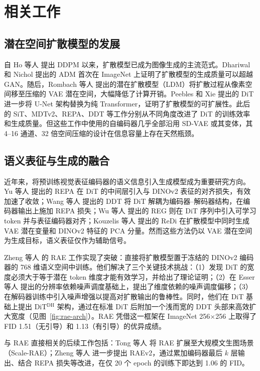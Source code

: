 \documentclass[11pt]{article}
\begin{document}
\section{相关工作}

\subsection{潜在空间扩散模型的发展}

自 Ho 等人\cite{ddpm} 提出 DDPM 以来，扩散模型已成为图像生成的主流范式。Dhariwal 和 Nichol\cite{adm} 提出的 ADM 首次在 ImageNet 上证明了扩散模型的生成质量可以超越 GAN\cite{gan}。随后，Rombach 等人\cite{ldm} 提出的潜在扩散模型（LDM）将扩散过程从像素空间移至压缩的 VAE 潜在空间，大幅降低了计算开销。Peebles 和 Xie\cite{dit} 提出的 DiT 进一步将 U-Net 架构替换为纯 Transformer，证明了扩散模型的可扩展性。此后的 SiT\cite{sit}、MDTv2\cite{mdtv2}、REPA\cite{repa}、DDT\cite{ddt} 等工作分别从不同角度改进了 DiT 的训练效率和生成质量。但这些工作中使用的自编码器几乎全部沿用 SD-VAE 或其变体，其 4--16 通道、32 倍空间压缩的设计在信息容量上存在天然瓶颈。

\subsection{语义表征与生成的融合}

近年来，将预训练视觉表征编码器的语义信息引入生成模型成为重要研究方向。Yu 等人\cite{repa} 提出的 REPA 在 DiT 的中间层引入与 DINOv2 表征的对齐损失，有效加速了收敛；Wang 等人\cite{ddt} 提出的 DDT 将 DiT 解耦为编码器--解码器结构，在编码器输出上施加 REPA 损失；Wu 等人\cite{reg} 提出的 REG 则在 DiT 序列中引入可学习 token 并与表征编码器对齐；Kouzelis 等人\cite{redi} 提出的 ReDi 在扩散模型中同时生成 VAE 潜在变量和 DINOv2 特征的 PCA 分量。然而这些方法仍以 VAE 潜在空间为生成目标，语义表征仅作为辅助信号。

Zheng 等人\cite{rae} 的 RAE 工作实现了突破：直接将扩散模型置于冻结的 DINOv2 编码器的 768 维语义空间中训练。他们解决了三个关键技术挑战：（1）发现 DiT 的宽度必须大于等于潜在 token 维度才能有效学习，并给出了理论证明；（2）在 Esser 等人\cite{sd3} 提出的分辨率依赖噪声调度基础上，提出了维度依赖的噪声调度偏移；（3）在解码器训练中引入噪声增强以提高对扩散输出的鲁棒性。同时，他们在 DiT 基础上提出 DiT$^{\mathrm{DH}}$ 架构，通过在标准 DiT 后附加一个浅而宽的 DDT 头部来高效扩大宽度（见图~\ref{fig:rae-arch}）。RAE 凭借这一框架在 ImageNet 256$\times$256 上取得了 FID 1.51（无引导）和 1.13（有引导）的优异成绩。

与 RAE 直接相关的后续工作包括：Tong 等人\cite{scale-rae} 将 RAE 扩展至大规模文生图场景（Scale-RAE）；Zheng 等人\cite{raev2} 进一步提出 RAEv2，通过累加编码器最后 $k$ 层输出、结合 REPA 损失等改进，在仅 20 个 epoch 的训练下即达到 1.06 的 FID。
\end{document}
